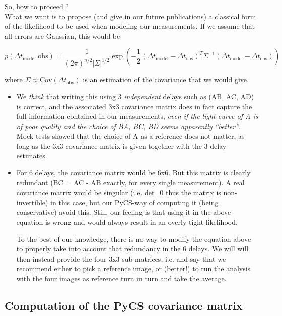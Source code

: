 \documentclass[11pt]{scrartcl}
\newcommand{\dt}[1]{\ensuremath{\Delta t_{\mathrm{#1}}}\xspace}
\begin{document}
So, how to proceed ?\\

What we want is to propose (and give in our future publications) a 
classical form of the likelihood to be used when modeling our 
measurements. If we assume that all errors are Gaussian, this 
would be

\begin{equation}
p(\dt{model} | \mathrm{obs}) = \frac{1}{(2 \pi)^{n/2} 
|\Sigma|^{1/2}}\exp\left( -\frac{1}{2} 
(\dt{model}-\dt{obs})^T\Sigma^{-1}(\dt{model}-\dt{obs}) \right)
\end{equation}

where $\Sigma \approx \textrm{Cov}(\dt{obs})$ is an estimation of the 
covariance that we would give.


\begin{itemize}
\item We \emph{think} that writing this using 3 \emph{independent} 
delays such as (AB, AC, 
AD) is correct, and the associated 3x3 covariance matrix does in fact 
capture the full information contained in our measurements, \emph{even 
if the light curve of A is of poor quality and the choice of BA, BC, BD 
seems apparently ``better''}. Mock tests showed that the choice of A as 
a reference does not 
matter, as long as the 3x3 covariance matrix is given together with the 
3 delay estimates.


\item For 6 delays, the covariance matrix would be 6x6. But this matrix 
is clearly redundant (BC = AC - AB exactly, for every single 
measurement). A real covariance matrix would be singular (i.e. det=0 
thus the matrix is non-invertible) in this case, but our PyCS-way of 
computing it (being conservative) avoid this. Still, our feeling is 
that 
using it in the above equation is wrong and would always result in an 
overly 
tight likelihood.

To the best of our knowledge, there is no way to modify the equation 
above to properly take into account that redundancy in the 6 delays. We 
will will then instead provide the four 3x3 sub-matrices, i.e. and 
say that we recommend 
either to pick a reference image, or (better!) to run the analysis with 
the four images as reference turn in turn and take the average.

\end{itemize}

\subsection*{Computation of the PyCS covariance matrix}
\end{document}
